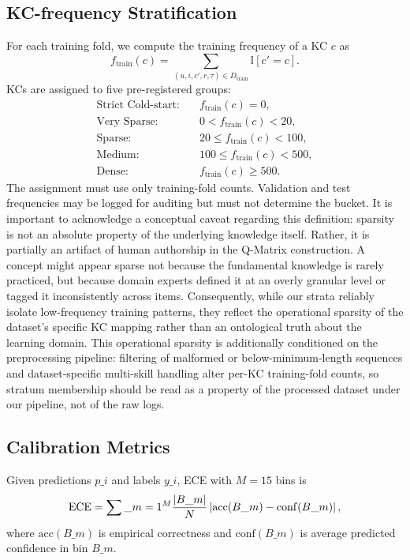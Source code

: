 \subsection{KC-frequency Stratification}
\label{sec:kc-strat}
For each training fold, we compute the training frequency of a KC $c$ as
\begin{equation}
f_{\mathrm{train}}(c)=\sum_{(u,i,c',r,\tau)\in D_{\mathrm{train}}}\mathbb{I}[c'=c].
\end{equation}
KCs are assigned to five pre-registered groups:
\begin{align}
\text{Strict Cold-start:} &\quad f_{\mathrm{train}}(c) = 0,\\
\text{Very Sparse:} &\quad 0 < f_{\mathrm{train}}(c) < 20,\\
\text{Sparse:} &\quad 20 \le f_{\mathrm{train}}(c) < 100,\\
\text{Medium:} &\quad 100 \le f_{\mathrm{train}}(c) < 500,\\
\text{Dense:} &\quad f_{\mathrm{train}}(c) \ge 500.
\end{align}
The assignment must use only training-fold counts. Validation and test frequencies may be logged for auditing but must not determine the bucket. It is important to acknowledge a conceptual caveat regarding this definition: sparsity is not an absolute property of the underlying knowledge itself. Rather, it is partially an artifact of human authorship in the Q-Matrix construction. A concept might appear sparse not because the fundamental knowledge is rarely practiced, but because domain experts defined it at an overly granular level or tagged it inconsistently across items. Consequently, while our strata reliably isolate low-frequency training patterns, they reflect the operational sparsity of the dataset's specific KC mapping rather than an ontological truth about the learning domain. This operational sparsity is additionally conditioned on the preprocessing pipeline: filtering of malformed or below-minimum-length sequences and dataset-specific multi-skill handling alter per-KC training-fold counts, so stratum membership should be read as a property of the processed dataset under our pipeline, not of the raw logs.

\subsection{Calibration Metrics}
Given predictions $p\_i$ and labels $y\_i$, ECE with $M=15$ bins is
\begin{equation}
\mathrm{ECE} = \sum\_{m=1}^{M}\frac{|B\_m|}{N}\left|\mathrm{acc}(B\_m)-\mathrm{conf}(B\_m)\right|,
\end{equation}
where $\mathrm{acc}(B\_m)$ is empirical correctness and $\mathrm{conf}(B\_m)$ is average predicted confidence in bin $B\_m$.

